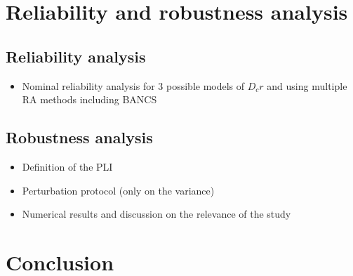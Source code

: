 \section{Reliability and robustness analysis}


\subsection{Reliability analysis}
\begin{itemize}
    \item Nominal reliability analysis for 3 possible models of $D_cr$ and using multiple RA methods including BANCS
\end{itemize}

\subsection{Robustness analysis}
\begin{itemize}
    \item Definition of the PLI
    \item Perturbation protocol (only on the variance)
    \item Numerical results and discussion on the relevance of the study  
\end{itemize}


\section{Conclusion}





